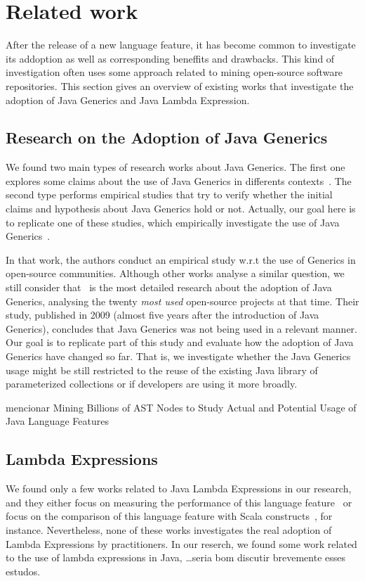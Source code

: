 \section{Related work}

After the release of a new language feature, it has become 
common to investigate its addoption as well as corresponding  
beneffits and drawbacks. This kind of investigation often uses 
some approach related to mining open-source software repositories. 
This section gives an overview of existing works that investigate 
the adoption of Java Generics and Java Lambda Expression.

\subsection{Research on the Adoption of Java Generics}

We found two main types of research works about Java Generics. The first one explores 
some claims about the use of Java Generics in differents contexts~\cite{}. The second type 
performs empirical studies that try to verify whether the initial claims and hypothesis 
about Java Generics hold or not. Actually, our goal here is to replicate one of these studies,
which empirically investigate the use of Java Generics~\cite{}. 

In that work, the authors conduct an empirical study w.r.t 
the use of Generics in open-source communities. Although other works 
analyse a similar question, we still consider that~\cite{} is the most detailed
research about the adoption of Java Generics, analysing the twenty \emph{most used} 
open-source projects at that time. Their study, published in 2009 (almost five years 
after the introduction of Java Generics), concludes that Java Generics was not 
being used in a relevant manner. Our goal is to replicate part of this study and evaluate how 
the adoption of Java Generics have changed so far. That is, we investigate whether 
the Java Generics usage might be still restricted to the reuse of the existing 
Java library of parameterized collections  or if developers are using it 
more broadly.

{\color{blue} mencionar Mining Billions of AST Nodes to Study Actual and
Potential Usage of Java Language Features }

\subsection{Lambda Expressions}

We found only a few works related to Java Lambda Expressions in our research, 
and they either focus on measuring the performance of this language feature~\cite{} or 
focus on the comparison of this language feature with Scala constructs~\cite{}, for instance. 
Nevertheless, none of these works investigates the real adoption of Lambda Expressions by 
practitioners. In our reserch, we found some work related to the use of lambda expressions in Java, 
\ldots {\color{red}seria bom discutir brevemente esses estudos.}


